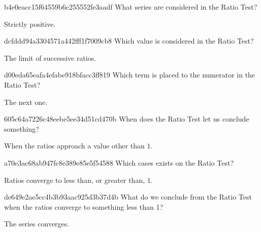 \begin{note}{b4e0eacc15f64559b6c255552fe3aadf}
    What series are considered in the Ratio Test?

    \begin{cloze}{1}
        Strictly positive.
    \end{cloze}
\end{note}

\begin{note}{dcfddd94a3304571a442fff1f7009cb8}
    Which value is considered in the Ratio Test?

    \begin{cloze}{1}
        The limit of successive ratios.
    \end{cloze}
\end{note}

\begin{note}{d00eda65eafa4efabe918bfacc3ff819}
    Which term is placed to the numerator in the Ratio Test?

    \begin{cloze}{1}
        The next one.
    \end{cloze}
\end{note}

\begin{note}{605c64a7226c48eebe5ee34d51cd470b}
    When does the Ratio Test let us conclude something?

    \begin{cloze}{1}
        When the ratios approach a value other than \({ 1 }\).
    \end{cloze}
\end{note}

\begin{note}{a70e3ac68ab947fc8e389e85e5f54588}
    Which cases exists on the Ratio Test?

    \begin{cloze}{1}
        Ratios converge to less than, or greater than, \({ 1 }\).
    \end{cloze}
\end{note}

\begin{note}{de649e2ae5cc4b3b93aac925d3b37d4b}
    What do we conclude from the Ratio Test when the ratios converge to something less than 1?

    \begin{cloze}{1}
        The series converges.
    \end{cloze}
\end{note}

